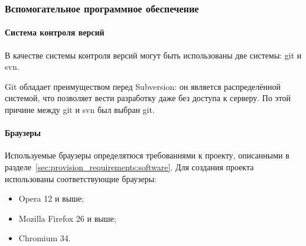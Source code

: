 \subsubsection{Вспомогательное программное обеспечение}


\paragraph{Система контроля версий}

В качестве системы контроля версий могут быть использованы две системы: git и svn.

Git обладает преимуществом перед Subversion: он является распределённой системой, что позволяет вести разработку даже без доступа к серверу. По этой причине между git и svn был выбран git.

\paragraph{Браузеры}

Используемые браузеры определятюся требованиями к проекту, описанными в разделе~\ref{sec:provision_requirements:software}. Для создания проекта использованы соответствующие браузеры:
\begin{itemize}
\item Opera 12 и выше;
\item Mozilla Firefox 26 и выше;
\item Chromium 34.
\end{itemize}
